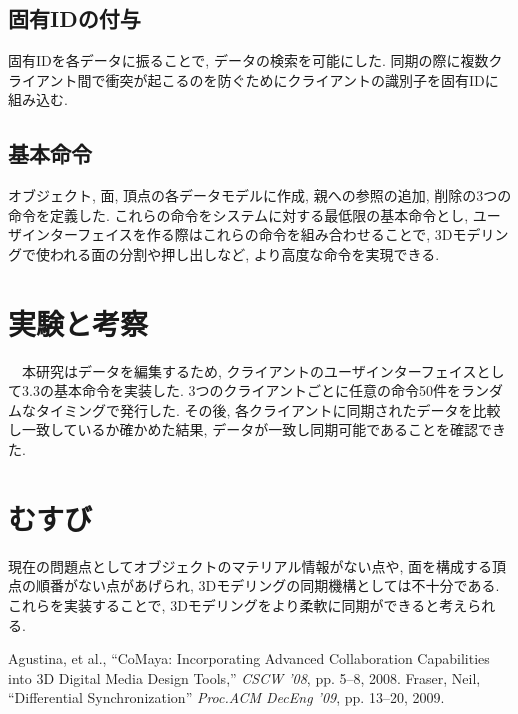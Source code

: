 \documentclass{AIabst}
\begin{document}
	\subsection{固有IDの付与}
	固有IDを各データに振ることで, データの検索を可能にした. 同期の際に複数クライアント間で衝突が起こるのを防ぐためにクライアントの識別子を固有IDに組み込む.
	\subsection{基本命令}
	オブジェクト, 面, 頂点の各データモデルに作成, 親への参照の追加, 削除の3つの命令を定義した.
	これらの命令をシステムに対する最低限の基本命令とし, ユーザインターフェイスを作る際はこれらの命令を組み合わせることで, 3Dモデリングで使われる面の分割や押し出しなど, より高度な命令を実現できる.
\section{実験と考察}
　本研究はデータを編集するため, クライアントのユーザインターフェイスとして3.3の基本命令を実装した.
 3つのクライアントごとに任意の命令50件をランダムなタイミングで発行した.
 その後, 各クライアントに同期されたデータを比較し一致しているか確かめた結果, データが一致し同期可能であることを確認できた.
\section{むすび}
 現在の問題点としてオブジェクトのマテリアル情報がない点や, 面を構成する頂点の順番がない点があげられ, 3Dモデリングの同期機構としては不十分である.
これらを実装することで, 3Dモデリングをより柔軟に同期ができると考えられる.

\begin{thebibliography}{9}
	Agustina, et al., ``CoMaya: Incorporating Advanced Collaboration Capabilities into 3D Digital Media Design Tools,'' {\it CSCW '08}, pp. 5--8, 2008.
  Fraser, Neil,	``Differential Synchronization''  {\it Proc.ACM DecEng '09}, pp. 13--20, 2009.
\end{thebibliography}
\end{document}
